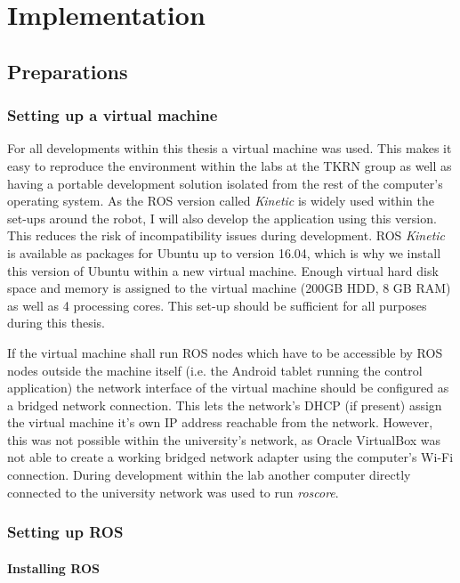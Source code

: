 \chapter{Implementation}
\label{chap:implementation}
\section{Preparations}
\subsection{Setting up a virtual machine}

For all developments within this thesis a virtual machine was used. This makes it easy to reproduce the environment within the labs at the TKRN group as well as having a portable development solution isolated from the rest of the computer's operating system. As the ROS version called \textit{Kinetic} is widely used within the set-ups around the robot, I will also develop the application using this version. This reduces the risk of incompatibility issues during development. ROS \textit{Kinetic} is available as packages for Ubuntu up to version 16.04\cite{ros:install}, which is why we install this version of Ubuntu within a new virtual machine. Enough virtual hard disk space and memory is assigned to the virtual machine (200GB HDD, 8 GB RAM) as well as 4 processing cores. This set-up should be sufficient for all purposes during this thesis. 

If the virtual machine shall run ROS nodes which have to be accessible by ROS nodes outside the machine itself (i.e. the Android tablet running the control application) the network interface of the virtual machine should be configured as a bridged network connection. This lets the network's DHCP (if present) assign the virtual machine it's own IP address reachable from the network. However, this was not possible within the university's network, as Oracle VirtualBox was not able to create a working bridged network adapter using the computer's Wi-Fi connection. During development within the lab another computer directly connected to the university network was used to run \textit{roscore}.

\subsection{Setting up ROS}

\subsubsection{Installing ROS}

